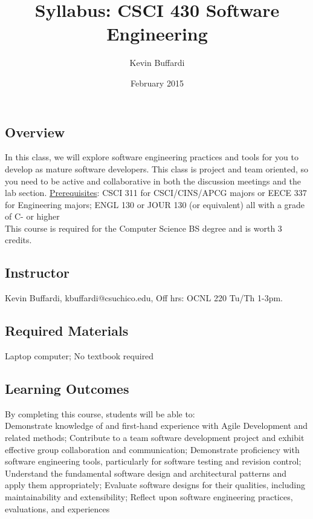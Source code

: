 \documentclass[12pt]{article}
\title{Syllabus: CSCI 430 Software Engineering}
\author{Kevin Buffardi}
\date{February 2015}
\begin{document}
  \maketitle
  \subsection*{Overview}	 
  \noindent
  In this class, we will explore software engineering practices and tools for you to develop as mature software developers. This class is project and team oriented, so you need to be active and collaborative in both the discussion meetings and the lab section.
  \newline
  \underline{Prerequisites}: CSCI 311 for CSCI/CINS/APCG majors or EECE 337 for Engineering majors; ENGL 130 or JOUR 130 (or equivalent) all with a grade of C- or higher \\
  This course is required for the Computer Science BS degree and is worth 3 credits. 
  
  \subsection*{Instructor}
  \noindent
  Kevin Buffardi, kbuffardi@csuchico.edu, Off hrs: OCNL 220 Tu/Th 1-3pm. \\

  \subsection*{Required Materials}
  \noindent
  Laptop computer; No textbook required
  \newline
  

  \subsection*{Learning Outcomes}
  \noindent
  By completing this course, students will be able to: \\
    Demonstrate knowledge of and first-hand experience with Agile Development and related
methods;  Contribute to a team software development project and exhibit effective group collaboration and communication; Demonstrate proficiency with software engineering tools, particularly for software testing and revision control; Understand the fundamental software design and architectural patterns and apply them appropriately; Evaluate software designs for their qualities, including maintainability and extensibility; Reflect upon software engineering practices, evaluations, and experiences \\
\end{document}
